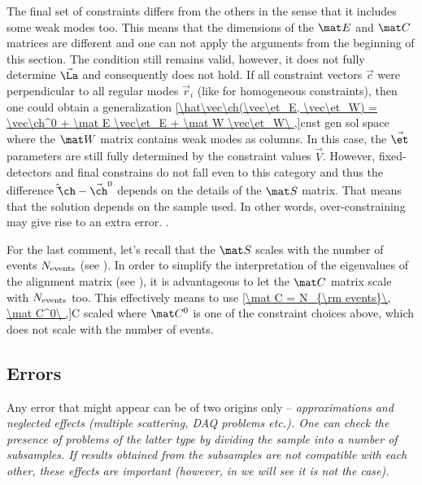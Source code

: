 The final set of constraints differs from the others in the sense that it includes some weak modes too. This means that the dimensions of the $\mat E$ and $\mat C$ matrices are different and one can not apply the arguments from the beginning of this section. The condition  still remains valid, however, it does not fully determine $\vec\La$ and consequently  does not hold. If all constraint vectors $\vec c$ were perpendicular to all regular modes $\vec r_i$ (like for homogeneous constraints), then one could obtain a generalization
\eqref{\hat\vec\ch(\vec\et_E, \vec\et_W) = \vec\ch^0 + \mat E \vec\et_E + \mat W \vec\et_W\ ,}{cnst gen sol space}
where the $\mat W$ matrix contains weak modes as columns. In this case, the $\vec\et$ parameters are still fully determined by the constraint values $\vec V$. However, fixed-detectors and final constrains do not fall even to this category and thus the difference $\hat\vec\ch - \vec\ch^0$ depends on the details of the $\mat S$ matrix. That means that the solution depends on the sample used. In other words, over-constraining may give rise to an extra error. .

For the last comment, let's recall that the $\mat S$ scales with the number of events $N_{\rm events}$ (see ). In order to simplify the interpretation of the eigenvalues of the alignment matrix (see ), it is advantageous to let the $\mat C$ matrix scale with $N_{\rm events}$ too. This effectively means to use
\eqref{\mat C = N_{\rm events}\, \mat C^0\ ,}{C scaled}
where $\mat C^0$ is one of the constraint choices above, which does not scale with the number of events.

\subsection[al err]{Errors}


Any error that might appear can be of two origins only -- \em{approximations} and \em{neglected effects} (multiple scattering, DAQ problems etc.). One can check the presence of problems of the latter type by dividing the sample into a number of subsamples. If results obtained from the subsamples are not compatible with each other, these effects are important (however, in  we will see it is not the case). 


